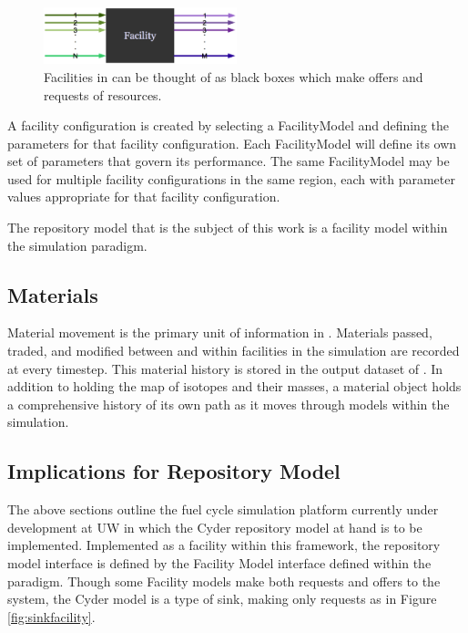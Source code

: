 \begin{figure}[htb!]
  \begin{center}
    \includegraphics[width=0.5\textwidth]{./chapters/paradigm/facility.eps}
  \end{center}
  \caption{Facilities in \Cyclus can be thought of as black boxes which make 
  offers and requests of resources.}
  \label{fig:facility}
\end{figure}


A facility configuration is created by selecting a FacilityModel and 
defining the parameters for that facility configuration.
Each FacilityModel will define its own set of parameters that 
govern its performance.  The same FacilityModel may be used for 
multiple facility configurations in the same region, each with 
parameter values appropriate for that facility configuration.

The repository model that is the subject of this work is a facility 
model within the \Cyclus simulation paradigm. 

\subsection{Materials}

Material movement is the primary unit of information in \Cyclus.  
Materials passed, traded, and modified between and within facilities 
in the simulation are recorded at every timestep.  This material 
history is stored in the output dataset of \Cyclus. In addition to 
holding the map of isotopes and their masses, a material object holds 
a comprehensive history of its own path as it moves through models 
within the simulation. 

\subsection{Implications for Repository Model}

The above sections outline the fuel cycle simulation platform
currently under development at \gls{UW} in which the Cyder repository model
at hand is to be implemented.  Implemented as a facility within this 
framework, the repository model interface is defined by the Facility
Model interface defined within the \Cyclus paradigm. Though some Facility 
models make both requests and offers to the system, the Cyder model is a type 
of sink, making only requests as in Figure \ref{fig:sinkfacility}.

